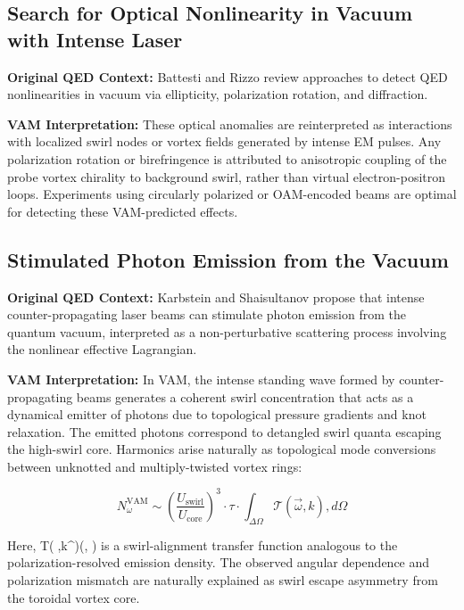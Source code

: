 \subsection{Search for Optical Nonlinearity in Vacuum with Intense Laser\cite{battesti2013search}}





\textbf{Original QED Context:} Battesti and Rizzo review approaches to detect QED nonlinearities in vacuum via ellipticity, polarization rotation, and diffraction.


\textbf{VAM Interpretation:} These optical anomalies are reinterpreted as interactions with localized swirl nodes or vortex fields generated by intense EM pulses. Any polarization rotation or birefringence is attributed to anisotropic coupling of the probe vortex chirality to background swirl, rather than virtual electron-positron loops. Experiments using circularly polarized or OAM-encoded beams are optimal for detecting these VAM-predicted effects.


\subsection{Stimulated Photon Emission from the Vacuum\cite{karbstein2016stimulated}}


\textbf{Original QED Context:} Karbstein and Shaisultanov propose that intense counter-propagating laser beams can stimulate photon emission from the quantum vacuum, interpreted as a non-perturbative scattering process involving the nonlinear effective Lagrangian.


\textbf{VAM Interpretation:} In VAM, the intense standing wave formed by counter-propagating beams generates a coherent swirl concentration that acts as a dynamical emitter of photons due to topological pressure gradients and knot relaxation. The emitted photons correspond to detangled swirl quanta escaping the high-swirl core. Harmonics arise naturally as topological mode conversions between unknotted and multiply-twisted vortex rings:

\begin{equation}

N_{\omega}^\text{VAM} \sim \left(\frac{U_\text{swirl}}{U_\text{core}}\right)^3 \cdot \tau \cdot \int_{\Delta \Omega} \mathcal{T}(\vec{\omega}, \hat{k}) , d\Omega

\end{equation}

Here, T(ω⃗,k^)(\vec{\omega}, ) is a swirl-alignment transfer function analogous to the polarization-resolved emission density. The observed angular dependence and polarization mismatch are naturally explained as swirl escape asymmetry from the toroidal vortex core.

